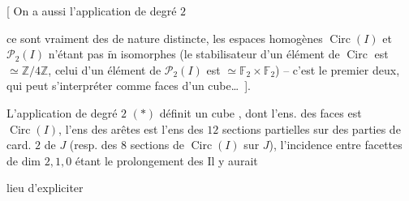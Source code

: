 [  On a aussi l'application de degré $2$


ce sont vraiment des  de nature distincte, les espaces homogènes  $\operatorname{Circ}(I)$ et $\mathscr P_2(I)$ n'étant pas $\widetilde{\mathrm m}$ isomorphes (le stabilisateur d'un élément de $\operatorname{Circ}$ est $\simeq\mathbb Z/4\mathbb Z$, celui d'un élément de $\mathscr P_2(I)$ est $\simeq\mathbb F_2\times\mathbb F_2$) -- c'est le premier  deux,  qui peut s'interpréter comme     faces d'un cube\ldots\ ].

L'application de degré $2$ $(*)$ définit un cube , dont l'ens. des faces est $\operatorname{Circ}(I)$,  l'ens des   arêtes  est l'ens des $12$ sections partielles  sur des parties de card. $2$ de $J$ (resp. des  $8$ sections de $\operatorname{Circ}(I)$ sur $J$), l'incidence entre facettes  de dim $2,1,0$ étant le prolongement des   Il y aurait




lieu d'expliciter

